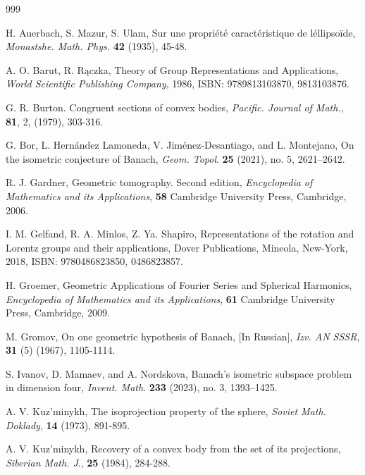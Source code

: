 \documentclass[11pt]{article}
\theoremstyle{definition}
\begin{document}
\begin{thebibliography}{999}
	
 H. Auerbach, S. Mazur, S. Ulam, Sur une propri\'et\'e caract\'eristique de l\'ellipso\"ide, \emph{Monastshe. Math.
	Phys.} {\bf 42} (1935), 45-48.
	
	 A. O. Barut, R. R\k{a}czka, Theory of Group Representations and Applications,
	\emph{World Scientific Publishing Company}, 1986, ISBN: 9789813103870, 9813103876.
	
	
	G. R. Burton. Congruent sections of convex bodies, \emph{Pacific. Journal of Math.}, {\bf 81}, 2, (1979), 303-316.
	
	
	G. Bor, L. Hern\'andez Lamoneda, V. Jim\'enez-Desantiago, and L. Montejano, On the isometric conjecture of
	Banach, \emph{Geom. Topol}. {\bf 25} (2021), no. 5, 2621–2642.
	
	
	R. J. Gardner, Geometric tomography. Second edition,
	\emph{Encyclopedia of Mathematics and its Applications}, {\bf 58} Cambridge University Press, Cambridge, 2006.
	
	
	
	 I. M. Gelfand, R. A. Minlos, Z. Ya. Shapiro, Representations of the  rotation and  Lorentz groups and their applications, Dover Publications, Mineola, New-York, 2018,
	ISBN: 9780486823850, 0486823857.
	
	
	 H. Groemer, Geometric Applications of Fourier Series and Spherical Harmonics,
	\emph{Encyclopedia of Mathematics and its Applications}, {\bf 61} Cambridge University Press, Cambridge, 2009.
	
	
	
	
	M. Gromov, On one geometric hypothesis of Banach, [In Russian], \emph{Izv. AN SSSR}, {\bf 31}
	(5) (1967), 1105-1114.


 S.  Ivanov, D. Mamaev, and A. Nordskova, Banach’s isometric subspace problem in dimension
four, \emph{Invent. Math}. {\bf 233} (2023), no. 3, 1393–1425.



 A. V. Kuz'minykh, The isoprojection property of the sphere, \emph{Soviet Math. Doklady}, {\bf 14} (1973), 891-895.


 A. V. Kuz'minykh, Recovery of a convex body from the set of its projections,  \emph{Siberian Math. J}., {\bf 25} (1984), 284-288.



\end{thebibliography}
\end{document}
